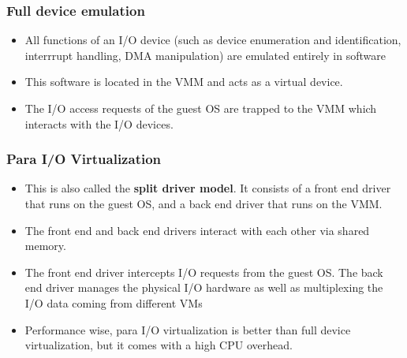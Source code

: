 \documentclass{article}
\begin{document}
\subsubsection{Full device emulation}
\begin{itemize}
    \item All functions of an I/O device (such as device enumeration and identification, interrrupt handling, DMA manipulation) are emulated entirely in software
    
    \item This software is located in the VMM and acts as a virtual device.
    
    \item The I/O access requests of the guest OS are trapped to the VMM which interacts with the I/O devices.
\end{itemize}

\subsubsection{Para I/O Virtualization}
\begin{itemize}
    \item This is also called the \textbf{split driver model}. It consists of a front end driver that runs on the guest OS, and a back end driver that runs on the VMM. 
    
    \item The front end and back end drivers interact with each other via shared memory.
    
    \item The front end driver intercepts I/O requests from the guest OS. The back end driver manages the physical I/O hardware as well as multiplexing the I/O data coming from different VMs
    
    \item Performance wise, para I/O virtualization is better than full device virtualization, but it comes with a high CPU overhead.
\end{itemize}
\end{document}
